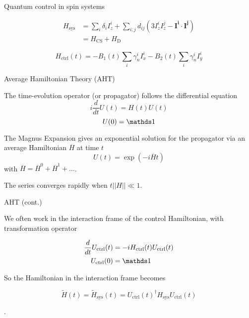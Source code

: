 \documentclass{beamer}
\begin{document}
\begin{frame}{Quantum control in spin systems}


\begin{align*}
    H_{\text{sys}} &= \sum_i \delta_i I_z^i + \sum_{i,j} d_{ij} \left( 3I_z^iI_z^j - \mathbf{I^i} \cdot \mathbf{I^j} \right) \\
        &= H_\text{CS} + H_\text{D}
\end{align*}

\[
    H_{\text{ctrl}}(t) = -B_1(t) \sum_i \gamma_n^i I_x^i -B_2(t) \sum_i \gamma_n^i I_y^i
\]

\end{frame}


\begin{frame}{Average Hamiltonian Theory (AHT)}

The time-evolution operator (or propagator) follows the differential
equation \[
i \frac{d}{dt} U(t) = H(t)U(t)
\] \[
U(0) = \identity
\]

The Magnus Expansion gives an exponential solution for the propagator
via an average Hamiltonian \(\overline{H}\) at time \(t\) \[
U(t) = \exp\left( -i \overline{H} t \right)
\] with \(\overline{H} = \overline{H}^0 + \overline{H}^1 + \dots\).

The series converges rapidly when \(t||H|| \ll 1\).

\end{frame}

\begin{frame}{AHT (cont.)}

We often work in the interaction frame of the control Hamiltonian, with transformation operator

\begin{align*}
    \frac{d}{dt} U_{\text{ctrl}}(t) &=
        -i H_{\text{ctrl}}(t)U_{\text{ctrl}}(t) \\
    U_{\text{ctrl}}(0) &= \identity
\end{align*}

So the Hamiltonian in the interaction frame becomes

\[
    \widetilde{H}(t) = \widetilde{H}_{\text{sys}}(t) = U_{\text{ctrl}}(t)^\dagger H_{\text{sys}} U_{\text{ctrl}}(t)
\]

\cite{brinkmann_2016}.
\end{frame}
\end{document}
